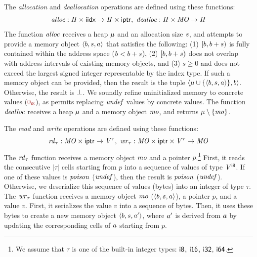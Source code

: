 The \emph{allocation} and \emph{deallocation} operations are defined using these functions:
\[ \mathit{alloc} : \mathit{H} \times \textsf{i\textsf{idx}} \to \mathit{H} \times \textsf{i\textsf{ptr}}, \ \mathit{dealloc} : \mathit{H} \times \mathit{MO} \to \mathit{H} \]
The function $\mathit{alloc}$ receives a heap $\mathit{\mu}$ and an allocation size $s$,
and attempts to provide a memory object $\langle{b},{s},{a}\rangle$ that satisfies the following:
(1) $[b, b + s)$ is fully contained within the address space (\ie $b < b + s$),
(2) $[b, b + s)$ does not overlap with address intervals of existing memory objects,
and (3) $s \geq 0$ and does not exceed the largest signed integer representable by the index type.
If such a memory object can be provided,
then the result is the tuple $\langle \mathit{\mu} \cup \{\langle{b},{s},{a}\rangle\}, b \rangle$.
Otherwise, the result is $\bot$.
%
We soundly refine uninitialized memory to concrete values ($\bvval{0}{8}$),
as \llvm permits replacing $\mathit{undef}$ values by concrete values.
%
The function $\mathit{dealloc}$ receives a heap $\mathit{\mu}$ and a memory object $\mathit{mo}$,
and returns $\mathit{\mu} \setminus \{\mathit{mo}\}$.

The \emph{read} and \emph{write} operations are defined using these functions:
\[ \moreadfunc{\tau} : \MemoryObjects \times \pointertype \to \Vals^{\tau}, \ \mowritefunc{\tau} : \MemoryObjects \times \pointertype \times \Vals^{\tau} \to \MemoryObjects \]
The $\mathit{rd}_{\tau}$ function receives a memory object $\mathit{mo}$ and a pointer $p$.\footnote{
We assume that $\tau$ is one of the built-in integer types: $\textsf{i8}$, $\textsf{i16}$, $\textsf{i32}$, $\textsf{i64}$.
}
First, it reads the consecutive $|\tau|$ cells starting from $p$ into a sequence of values of type $\mathit{V}^{\textsf{i8}}$.
If one of these values is $\mathit{poison}$ ($\mathit{undef}$), then the result is $\mathit{poison}$ ($\mathit{undef}$).
Otherwise, we deserialize this sequence of values (bytes) into an integer of type $\tau$.
The $\mathit{wr}_{\tau}$ function receives a memory object $\mathit{mo}$ (\ie $\langle{b},{s},{a}\rangle$), a pointer $p$, and a value $v$.
First, it serializes the value $v$ into a sequence of bytes.
Then, it uses these bytes to create a new memory object $\langle{b},{s},{a'}\rangle$,
where $a'$ is derived from $a$ by updating the corresponding cells of $a$ starting from $p$.

